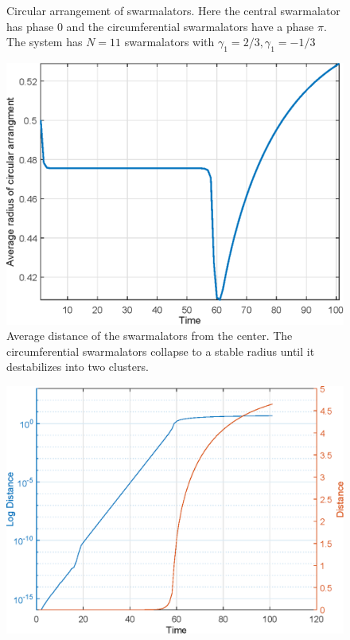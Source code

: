 \documentclass[twocolumn,10pt]{asme2ej}
\begin{document}
{\begin{figure}[h!]
        \caption{Circular arrangement of swarmalators. Here the central swarmalator has phase \(0\) and the circumferential swarmalators have a phase \(\pi\). The system has \(N = 11\) swarmalators with \(\gamma_1 = 2/3,\gamma_1 = -1/3\)}
        \label{fig:circleArr}
    \end{figure}
    \begin{figure}[h!]
        \includegraphics[width=\linewidth]{radiiVtime.eps}
        \caption{Average distance of the swarmalators from the center. The circumferential swarmalators collapse to a stable radius until it destabilizes into two clusters.}
        \label{fig:radVtime}
    \end{figure}
    \begin{figure}[h!]
        \includegraphics[width = \linewidth]{centerDistVtime.eps}

\end{figure}}
\end{document}
